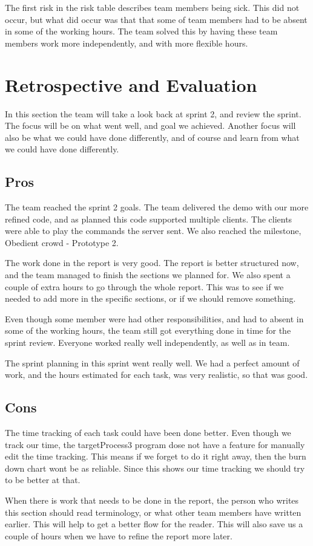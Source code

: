 The first risk in the risk table describes team members being sick. This did not occur, but what did occur was that that some of team members had to be absent in some of the working hours. 
The team solved this by having these team members work more independently, and with more flexible hours.  

\section{Retrospective and Evaluation}
In this section the team will take a look back at sprint 2, and review the sprint. The focus will be on what went well, and goal we achieved. Another focus will also be what we could have done differently, and of course and learn from what we could have done differently.

\subsection{Pros}
The team reached the sprint 2 goals. The team delivered the demo with our more refined code, and as planned this code supported multiple clients. The clients were able to play the commands the server sent. We also reached the milestone, Obedient crowd - Prototype 2.

The work done in the report is very good. The report is better structured now, and the team managed to finish the sections we planned for. We also spent a couple of extra hours to go through the whole report. This was to see if we needed to add more in the specific sections, or if we should remove something.  

Even though some member were had other responsibilities, and had to absent in some of the working hours, the team still got everything done in time for the sprint review. Everyone worked really well independently, as well as in team. 

The sprint planning in this sprint went really well. We had a perfect amount of work, and the hours estimated for each task, was very realistic, so that was good. 


\subsection{Cons}
The time tracking of each task could have been done better. 
Even though we track our time, the targetProcess3 program dose not have a feature for manually edit the time tracking. 
This means if we forget to do it right away, then the burn down chart wont be as reliable. Since this shows our time tracking we should try to be better at that.

When there is work that needs to be done in the report, the person who writes this section should read terminology, or what other team members have written earlier. This will help to get a better flow for the reader.
This will also save us a couple of hours when we have to refine the report more later. 